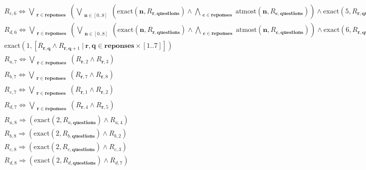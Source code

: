 \documentclass[fleqn]{article}
\begin{document}
\begin{multline*}
R_{c,6} \Leftrightarrow \bigvee\limits_{\substack{\mathbf{r}\in \mathbf{reponses}}}\left(\bigvee\limits_{\substack{\mathbf{n}\in [0..8]}}\left(\textrm{exact}(\mathbf{n},R_{\mathbf{r},\mathbf{questions}}) \wedge \bigwedge\limits_{\substack{\mathbf{c}\in \mathbf{reponses}}}\textrm{atmost}(\mathbf{n},R_{\mathbf{c},\mathbf{questions}})\right) \wedge \textrm{exact}(5,R_{\mathbf{r},\mathbf{questions}})\right)\\
R_{d,6} \Leftrightarrow \bigvee\limits_{\substack{\mathbf{r}\in \mathbf{reponses}}}\left(\bigvee\limits_{\substack{\mathbf{n}\in [0..8]}}\left(\textrm{exact}(\mathbf{n},R_{\mathbf{r},\mathbf{questions}}) \wedge \bigwedge\limits_{\substack{\mathbf{c}\in \mathbf{reponses}}}\textrm{atmost}(\mathbf{n},R_{\mathbf{c},\mathbf{questions}})\right) \wedge \textrm{exact}(6,R_{\mathbf{r},\mathbf{questions}})\right)\\
\textrm{exact}(1,[R_{\mathbf{r},\mathbf{q}} \wedge R_{\mathbf{r},\mathbf{q} + 1}~|~\mathbf{r},\mathbf{q}\in \mathbf{reponses} \times [1..7]])\\
R_{a,7} \Leftrightarrow \bigvee\limits_{\substack{\mathbf{r}\in \mathbf{reponses}}}\left(R_{\mathbf{r},2} \wedge R_{\mathbf{r},3}\right)\\
R_{b,7} \Leftrightarrow \bigvee\limits_{\substack{\mathbf{r}\in \mathbf{reponses}}}\left(R_{\mathbf{r},7} \wedge R_{\mathbf{r},8}\right)\\
R_{c,7} \Leftrightarrow \bigvee\limits_{\substack{\mathbf{r}\in \mathbf{reponses}}}\left(R_{\mathbf{r},1} \wedge R_{\mathbf{r},2}\right)\\
R_{d,7} \Leftrightarrow \bigvee\limits_{\substack{\mathbf{r}\in \mathbf{reponses}}}\left(R_{\mathbf{r},4} \wedge R_{\mathbf{r},5}\right)\\
R_{a,8} \Rightarrow \left(\textrm{exact}(2,R_{a,\mathbf{questions}}) \wedge R_{a,4}\right)\\
R_{b,8} \Rightarrow \left(\textrm{exact}(2,R_{b,\mathbf{questions}}) \wedge R_{b,2}\right)\\
R_{c,8} \Rightarrow \left(\textrm{exact}(2,R_{c,\mathbf{questions}}) \wedge R_{c,3}\right)\\
R_{d,8} \Rightarrow \left(\textrm{exact}(2,R_{d,\mathbf{questions}}) \wedge R_{d,7}\right)\\
\end{multline*}
\end{document}
